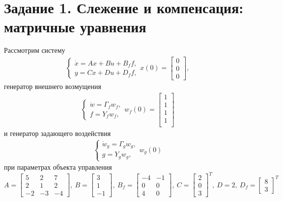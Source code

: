 \documentclass[a4paper, 12pt]{article}
\begin{document}
    \section{Задание 1. Слежение и компенсация: матричные уравнения}
    Рассмотрим систему
    \begin{align}
    \begin{cases}
        \dot{x}=Ax+Bu+B_ff,\\
        y=Cx+Du+D_ff,
    \end{cases}
    x(0)=\begin{bmatrix}
        0\\0\\0
    \end{bmatrix},\label{eq:sys1}
    \end{align}
    генератор внешнего возмущения
    \begin{align}
    \begin{cases}
        \dot{w}=\Gamma_f w_f,\\
        f=Y_fw_f,
    \end{cases} w_f(0)=\begin{bmatrix}
        1\\1\\1\\1\\
    \end{bmatrix}\label{eq:sys12}
    \end{align}
    и генератор задающего воздействия
    \begin{align}
    \begin{cases}
        \dot{w}_g=\Gamma_gw_g,\\
        g=Y_gw_g,
    \end{cases} w_g(0)\label{eq:sys13}
    \end{align}
    при параметрах объекта управления
    $$
    A=\begin{bmatrix}
        5 &2 &7\\
        2 &1 &2\\
        -2 &-3 &-4
    \end{bmatrix},\ B=\begin{bmatrix}
        3\\1\\-1
    \end{bmatrix},\ B_f=\begin{bmatrix}
        -4 &-1\\
        0 &0\\
        4 &0
    \end{bmatrix},\ C=\begin{bmatrix}
        2\\0\\3
    \end{bmatrix}^T,\ D=2,\ D_f=\begin{bmatrix}
        8\\3
    \end{bmatrix}^T
    $$
\end{document}
